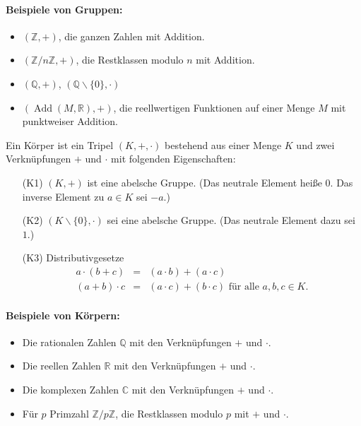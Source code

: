 \documentclass[a4paper,12pt,DIV15]{scrartcl}
\begin{document}
\paragraph{Beispiele von Gruppen:}

\begin{itemize}
\item $(\mathbb{Z},+)$, die ganzen Zahlen mit Addition.
\item $(\mathbb{Z}/n\mathbb{Z},+)$, die Restklassen modulo $n$ mit Addition.
\item $(\mathbb{Q},+)$, $(\mathbb{Q} \smallsetminus \{ 0 \} ,\cdot)$
\item $(\mathop{Add}(M,\mathbb{R}),+)$, die reellwertigen Funktionen auf einer Menge $M$ mit punktweiser Addition.
\end{itemize} 

\begin{defn}[Körper]
Ein {\color{red} Körper} ist ein Tripel $(K,+,\cdot)$ bestehend aus einer
Menge $K$ und zwei Verknüpfungen $+$ und $\cdot$ mit folgenden
Eigenschaften:
\begin{itemize}
\item [(K1)] $(K,+)$ ist eine abelsche Gruppe. (Das neutrale Element
heiße $0$. Das inverse Element zu $a \in K$ sei $-a$.) 
\item [(K2)] $(K \smallsetminus \{ 0 \}, \cdot)$ sei eine abelsche
Gruppe. (Das neutrale Element dazu sei $1$.)
\item [(K3)] Distributivgesetze
\begin{eqnarray*}
a \cdot (b + c) & = & (a \cdot b) + (a \cdot c)\\
(a+b) \cdot c & = &   (a \cdot c) + (b \cdot c) \mbox{ für alle }
a,b,c \in K.
\end{eqnarray*}
\end{itemize}
\end{defn}

\paragraph{Beispiele von Körpern:}
\begin{itemize}
\item Die rationalen Zahlen $\mathbb{Q}$ mit den Verknüpfungen $+$ und $\cdot$.
\item Die reellen Zahlen $\mathbb{R}$ mit den Verknüpfungen $+$ und $\cdot$.
\item Die komplexen Zahlen $\mathbb{C}$ mit den Verknüpfungen $+$ und $\cdot$.
\item Für $p$ Primzahl $\mathbb{Z}/p\mathbb{Z}$, die Restklassen modulo $p$ mit $+$ und $\cdot$.
\end{itemize}
\end{document}
